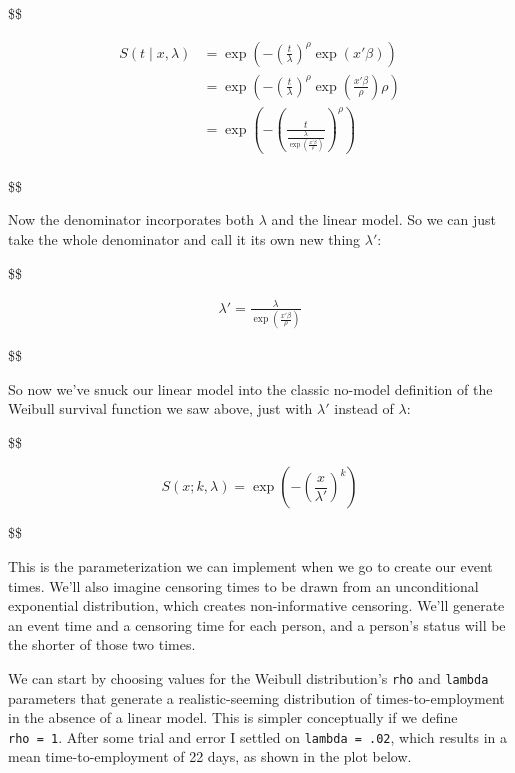 \documentclass[
  letterpaper,
  DIV=11,
  numbers=noendperiod]{scrreprt}
\begin{document}
\$\$

\begin{align*}
S(t \mid x, \lambda) &= \exp\left(-\left(\frac{t}{\lambda}\right)^{\rho} \exp(x' \beta)\right) \\
&= \exp\left(-\left(\frac{t}{\lambda}\right)^{\rho} \exp\left(\frac{x' \beta}{\rho}\right)\rho\right) \\
&= \exp\left(-\left(\frac{t}{\frac{\lambda}{\exp\left(\frac{x' \beta}{\rho}\right)}}\right)^{\rho}\right) \\
\end{align*}

\$\$

Now the denominator incorporates both \(\lambda\) and the linear model.
So we can just take the whole denominator and call it its own new thing
\(\lambda'\):

\$\$

\begin{align*}
\lambda' = \frac{\lambda}{\exp\left(\frac{x' \beta}{\rho}\right)}
\end{align*}

\$\$

So now we've snuck our linear model into the classic no-model definition
of the Weibull survival function we saw above, just with \(\lambda'\)
instead of \(\lambda\):

\$\$

\begin{equation}
S(x; k, \lambda) = \exp\left(-\left(\frac{x}{\lambda'}\right)^{k}\right)
\end{equation}

\$\$

This is the parameterization we can implement when we go to create our
event times. We'll also imagine censoring times to be drawn from an
unconditional exponential distribution, which creates non-informative
censoring. We'll generate an event time and a censoring time for each
person, and a person's status will be the shorter of those two times.

We can start by choosing values for the Weibull distribution's
\texttt{rho} and \texttt{lambda} parameters that generate a
realistic-seeming distribution of times-to-employment in the absence of
a linear model. This is simpler conceptually if we define
\texttt{rho\ =\ 1}. After some trial and error I settled on
\texttt{lambda\ =\ .02}, which results in a mean time-to-employment of
22 days, as shown in the plot below.
\end{document}
